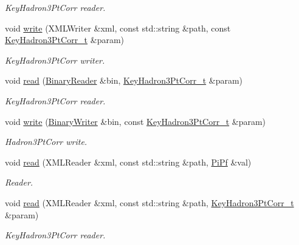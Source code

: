 \begin{DoxyCompactItemize}
\begin{DoxyCompactList}\small\item\em Key\+Hadron3\+Pt\+Corr reader. \end{DoxyCompactList}\item 
void \mbox{\hyperlink{namespaceFF_a9e6eed897710dbad982d5a699a70f857}{write}} (X\+M\+L\+Writer \&xml, const std\+::string \&path, const \mbox{\hyperlink{structFF_1_1KeyHadron3PtCorr__t}{Key\+Hadron3\+Pt\+Corr\+\_\+t}} \&param)
\begin{DoxyCompactList}\small\item\em Key\+Hadron3\+Pt\+Corr writer. \end{DoxyCompactList}\item 
void \mbox{\hyperlink{namespaceFF_a257b587cc1107da7cde8c3d17ea5ce50}{read}} (\mbox{\hyperlink{classADATIO_1_1BinaryReader}{Binary\+Reader}} \&bin, \mbox{\hyperlink{structFF_1_1KeyHadron3PtCorr__t}{Key\+Hadron3\+Pt\+Corr\+\_\+t}} \&param)
\begin{DoxyCompactList}\small\item\em Key\+Hadron3\+Pt\+Corr reader. \end{DoxyCompactList}\item 
void \mbox{\hyperlink{namespaceFF_a7d3abdd11ac7f8c96ec4cfab1360b20a}{write}} (\mbox{\hyperlink{classADATIO_1_1BinaryWriter}{Binary\+Writer}} \&bin, const \mbox{\hyperlink{structFF_1_1KeyHadron3PtCorr__t}{Key\+Hadron3\+Pt\+Corr\+\_\+t}} \&param)
\begin{DoxyCompactList}\small\item\em Hadron3\+Pt\+Corr write. \end{DoxyCompactList}\item 
void \mbox{\hyperlink{namespaceFF_a951fc6aa6ba4be7a0eb44c600fce48f0}{read}} (X\+M\+L\+Reader \&xml, const std\+::string \&path, \mbox{\hyperlink{structFF_1_1PiPf}{Pi\+Pf}} \&val)
\begin{DoxyCompactList}\small\item\em Reader. \end{DoxyCompactList}\item 
void \mbox{\hyperlink{namespaceFF_a457d1bd921b678eadc34fb2dbfcbdb32}{read}} (X\+M\+L\+Reader \&xml, const std\+::string \&path, \mbox{\hyperlink{structFF_1_1KeyHadron3PtCorr__t}{Key\+Hadron3\+Pt\+Corr\+\_\+t}} \&param)
\begin{DoxyCompactList}\small\item\em Key\+Hadron3\+Pt\+Corr reader. \end{DoxyCompactList}\end{DoxyCompactItemize}



